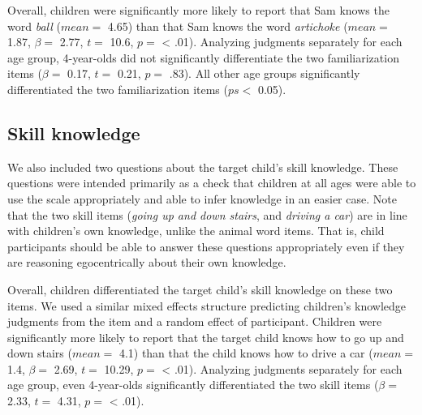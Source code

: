 \documentclass[10pt, letterpaper]{article}
\begin{document}
Overall, children were significantly more likely to report that Sam
knows the word \emph{ball} (\(mean =\) 4.65) than that Sam knows the
word \emph{artichoke} (\(mean =\) 1.87, \(\beta =\) 2.77, \(t =\) 10.6,
\(p =\) \textless{} .01). Analyzing judgments separately for each age
group, 4-year-olds did not significantly differentiate the two
familiarization items (\(\beta =\) 0.17, \(t =\) 0.21, \(p =\) .83). All
other age groups significantly differentiated the two familiarization
items (\(ps <\) 0.05).

\hypertarget{skill-knowledge}{%
\subsection{Skill knowledge}\label{skill-knowledge}}

We also included two questions about the target child's skill knowledge.
These questions were intended primarily as a check that children at all
ages were able to use the scale appropriately and able to infer
knowledge in an easier case. Note that the two skill items (\emph{going
up and down stairs}, and \emph{driving a car}) are in line with
children's own knowledge, unlike the animal word items. That is, child
participants should be able to answer these questions appropriately even
if they are reasoning egocentrically about their own knowledge.

Overall, children differentiated the target child's skill knowledge on
these two items. We used a similar mixed effects structure predicting
children's knowledge judgments from the item and a random effect of
participant. Children were significantly more likely to report that the
target child knows how to go up and down stairs (\(mean =\) 4.1) than
that the child knows how to drive a car (\(mean =\) 1.4, \(\beta =\)
2.69, \(t =\) 10.29, \(p =\) \textless{} .01). Analyzing judgments
separately for each age group, even 4-year-olds significantly
differentiated the two skill items (\(\beta =\) 2.33, \(t =\) 4.31,
\(p =\) \textless{} .01).
\end{document}
